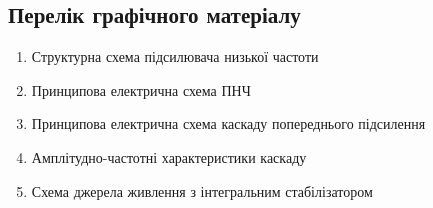 \documentclass[main.tex]{subfiles}
\begin{document}
\subsection{Перелік графічного матеріалу}
\begin{enumerate}
    \item Структурна схема підсилювача низької частоти
    \item Принципова електрична схема ПНЧ
    \item Принципова електрична схема каскаду попереднього підсилення
    \item Амплітудно-частотні характеристики каскаду
    \item Схема джерела живлення з інтегральним стабілізатором
\end{enumerate}
\end{document}
